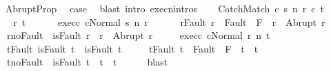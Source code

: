 \begin{isabellebody}
\isanewline
\ \ \isamarkupfalse%
\ AbruptProp\ \isamarkupfalse%
\ {\isacharquery}case\ \isamarkupfalse%
\ {\isacharparenleft}blast\ intro{\isacharcolon}\ execn{\isachardot}intros{\isacharparenright}\isanewline
{}\isamarkupfalse%
\isanewline
\ \ \isamarkupfalse%
\ {\isacharparenleft}CatchMatch\ c{}\ s\ n\ r\ c{}\ t{\isacharparenright}\isanewline
\ \ \isamarkupfalse%
\ \isamarkupfalse%
\ r{\isacharprime}\ t{\isacharprime}\ \ \isanewline
\ \ \ \ exec{\isacharunderscore}c{}{\isacharcolon}\ {\isachardoublequoteopen}{\isasymGamma}{\isasymturnstile}{\isasymlangle}c{}{\isacharcomma}Normal\ s{\isasymrangle}\ {\isacharequal}n{\isasymRightarrow}\ r{\isacharprime}{\isachardoublequoteclose}\ \ \isanewline
\ \ \ \ r{\isacharprime}{\isacharunderscore}Fault{\isacharcolon}\ {\isachardoublequoteopen}r{\isacharprime}\ {\isasymin}\ Fault\ {\isacharbackquote}\ {\isacharparenleft}{\isacharminus}F{\isacharparenright}\ {\isasymlongrightarrow}\ r{\isacharprime}\ {\isacharequal}\ Abrupt\ r{\isachardoublequoteclose}\ \isanewline
\ \ \ \ r{\isacharprime}{\isacharunderscore}noFault{\isacharcolon}\ {\isachardoublequoteopen}{\isasymnot}\ isFault\ r{\isacharprime}\ {\isasymlongrightarrow}\ r{\isacharprime}\ {\isacharequal}\ Abrupt\ r{\isachardoublequoteclose}\ \isanewline
\ \ \ \ exec{\isacharunderscore}c{}{\isacharcolon}\ {\isachardoublequoteopen}{\isasymGamma}{\isasymturnstile}{\isasymlangle}c{}{\isacharcomma}Normal\ r{\isasymrangle}\ {\isacharequal}n{\isasymRightarrow}\ t{\isacharprime}{\isachardoublequoteclose}\ \isanewline
\ \ \ \ t{\isacharunderscore}Fault{\isacharcolon}\ {\isachardoublequoteopen}isFault\ t\ {\isasymlongrightarrow}\ isFault\ t{\isacharprime}{\isachardoublequoteclose}\ \isanewline
\ \ \ \ t{\isacharprime}{\isacharunderscore}Fault{\isacharcolon}\ {\isachardoublequoteopen}t{\isacharprime}\ {\isasymin}\ Fault\ {\isacharbackquote}\ {\isacharparenleft}{\isacharminus}F{\isacharparenright}\ {\isasymlongrightarrow}\ t{\isacharprime}\ {\isacharequal}\ t{\isachardoublequoteclose}\ \isanewline
\ \ \ \ t{\isacharprime}{\isacharunderscore}noFault{\isacharcolon}\ {\isachardoublequoteopen}{\isasymnot}\ isFault\ t{\isacharprime}\ {\isasymlongrightarrow}\ t{\isacharprime}\ {\isacharequal}\ t{\isachardoublequoteclose}\isanewline
\ \ \ \ \isamarkupfalse%
\ blast\isanewline

\end{isabellebody}
